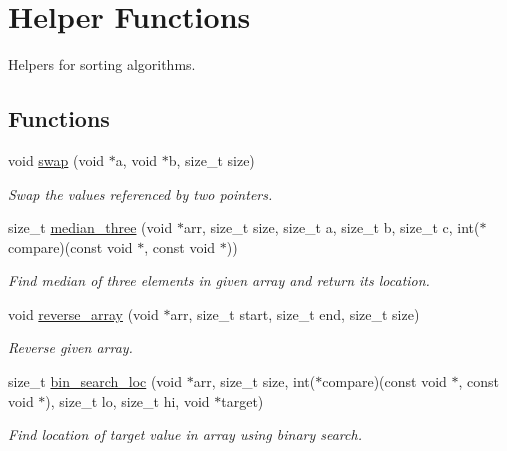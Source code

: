 \hypertarget{group__SortingHelper}{}\section{Helper Functions}
\label{group__SortingHelper}


Helpers for sorting algorithms.  


\subsection*{Functions}
\begin{DoxyCompactItemize}
\item 
void \hyperlink{group__SortingHelper_gac005eaa05ec80dbf1a0984d3d4fa80a8}{swap} (void $\ast$a, void $\ast$b, size\+\_\+t size)
\begin{DoxyCompactList}\small\item\em Swap the values referenced by two pointers. \end{DoxyCompactList}\item 
size\+\_\+t \hyperlink{group__SortingHelper_ga7ca72135e6d6f9e7af0ea60d653efb09}{median\+\_\+three} (void $\ast$arr, size\+\_\+t size, size\+\_\+t a, size\+\_\+t b, size\+\_\+t c, int($\ast$compare)(const void $\ast$, const void $\ast$))
\begin{DoxyCompactList}\small\item\em Find median of three elements in given array and return its location. \end{DoxyCompactList}\item 
void \hyperlink{group__SortingHelper_gae26181b67ffd4261a676f39624c3ce68}{reverse\+\_\+array} (void $\ast$arr, size\+\_\+t start, size\+\_\+t end, size\+\_\+t size)
\begin{DoxyCompactList}\small\item\em Reverse given array. \end{DoxyCompactList}\item 
size\+\_\+t \hyperlink{group__SortingHelper_ga347d3eac5748d59424afd8566181fc27}{bin\+\_\+search\+\_\+loc} (void $\ast$arr, size\+\_\+t size, int($\ast$compare)(const void $\ast$, const void $\ast$), size\+\_\+t lo, size\+\_\+t hi, void $\ast$target)
\begin{DoxyCompactList}\small\item\em Find location of target value in array using binary search. \end{DoxyCompactList}\end{DoxyCompactItemize}


